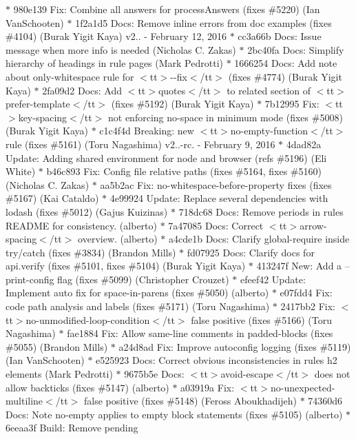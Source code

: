 \begin{DoxyItemize}
\texorpdfstring{$\ast$}{*} 980e139 Fix\+: Combine all answers for process\+Answers (fixes \#5220) (\+Ian Van\+Schooten) \texorpdfstring{$\ast$}{*} 1f2a1d5 Docs\+: Remove inline errors from doc examples (fixes \#4104) (\+Burak Yigit Kaya)  v2.. -\/ February 12, 2016  \texorpdfstring{$\ast$}{*} cc3a66b Docs\+: Issue message when more info is needed (\+Nicholas C. Zakas) \texorpdfstring{$\ast$}{*} 2bc40fa Docs\+: Simplify hierarchy of headings in rule pages (\+Mark Pedrotti) \texorpdfstring{$\ast$}{*} 1666254 Docs\+: Add note about only-\/whitespace rule for $<$tt$>$-\/-\/fix$<$/tt$>$ (fixes \#4774) (\+Burak Yigit Kaya) \texorpdfstring{$\ast$}{*} 2fa09d2 Docs\+: Add $<$tt$>$quotes$<$/tt$>$ to related section of $<$tt$>$prefer-\/template$<$/tt$>$ (fixes \#5192) (\+Burak Yigit Kaya) \texorpdfstring{$\ast$}{*} 7b12995 Fix\+: $<$tt$>$key-\/spacing$<$/tt$>$ not enforcing no-\/space in minimum mode (fixes \#5008) (\+Burak Yigit Kaya) \texorpdfstring{$\ast$}{*} c1c4f4d Breaking\+: new $<$tt$>$no-\/empty-\/function$<$/tt$>$ rule (fixes \#5161) (\+Toru Nagashima)  v2..-\/rc. -\/ February 9, 2016  \texorpdfstring{$\ast$}{*} 4dad82a Update\+: Adding shared environment for node and browser (refs \#5196) (\+Eli White) \texorpdfstring{$\ast$}{*} b46c893 Fix\+: Config file relative paths (fixes \#5164, fixes \#5160) (\+Nicholas C. Zakas) \texorpdfstring{$\ast$}{*} aa5b2ac Fix\+: no-\/whitespace-\/before-\/property fixes (fixes \#5167) (\+Kai Cataldo) \texorpdfstring{$\ast$}{*} 4e99924 Update\+: Replace several dependencies with lodash (fixes \#5012) (\+Gajus Kuizinas) \texorpdfstring{$\ast$}{*} 718dc68 Docs\+: Remove periods in rules\textquotesingle{} README for consistency. (alberto) \texorpdfstring{$\ast$}{*} 7a47085 Docs\+: Correct $<$tt$>$arrow-\/spacing$<$/tt$>$ overview. (alberto) \texorpdfstring{$\ast$}{*} a4cde1b Docs\+: Clarify global-\/require inside try/catch (fixes \#3834) (\+Brandon Mills) \texorpdfstring{$\ast$}{*} fd07925 Docs\+: Clarify docs for api.\+verify (fixes \#5101, fixes \#5104) (\+Burak Yigit Kaya) \texorpdfstring{$\ast$}{*} 413247f New\+: Add a --print-\/config flag (fixes \#5099) (\+Christopher Crouzet) \texorpdfstring{$\ast$}{*} efeef42 Update\+: Implement auto fix for space-\/in-\/parens (fixes \#5050) (alberto) \texorpdfstring{$\ast$}{*} e07fdd4 Fix\+: code path analysis and labels (fixes \#5171) (\+Toru Nagashima) \texorpdfstring{$\ast$}{*} 2417bb2 Fix\+: $<$tt$>$no-\/unmodified-\/loop-\/condition$<$/tt$>$ false positive (fixes \#5166) (\+Toru Nagashima) \texorpdfstring{$\ast$}{*} fae1884 Fix\+: Allow same-\/line comments in padded-\/blocks (fixes \#5055) (\+Brandon Mills) \texorpdfstring{$\ast$}{*} a24d8ad Fix\+: Improve autoconfig logging (fixes \#5119) (\+Ian Van\+Schooten) \texorpdfstring{$\ast$}{*} e525923 Docs\+: Correct obvious inconsistencies in rules h2 elements (\+Mark Pedrotti) \texorpdfstring{$\ast$}{*} 9675b5e Docs\+: $<$tt$>$avoid-\/escape$<$/tt$>$ does not allow backticks (fixes \#5147) (alberto) \texorpdfstring{$\ast$}{*} a03919a Fix\+: $<$tt$>$no-\/unexpected-\/multiline$<$/tt$>$ false positive (fixes \#5148) (\+Feross Aboukhadijeh) \texorpdfstring{$\ast$}{*} 74360d6 Docs\+: Note no-\/empty applies to empty block statements (fixes \#5105) (alberto) \texorpdfstring{$\ast$}{*} 6eeaa3f Build\+: Remove pending 
\end{DoxyItemize}
